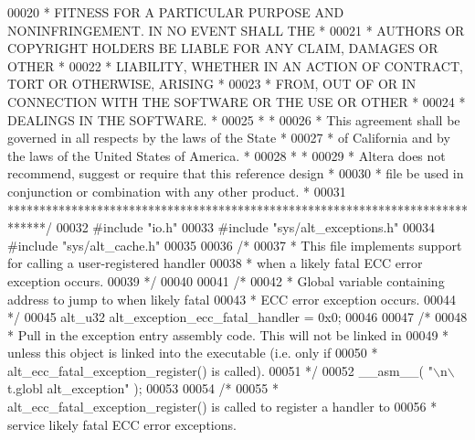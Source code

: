 \begin{DoxyCode}
00020 \textcolor{comment}{* FITNESS FOR A PARTICULAR PURPOSE AND NONINFRINGEMENT. IN NO EVENT SHALL THE *}
00021 \textcolor{comment}{* AUTHORS OR COPYRIGHT HOLDERS BE LIABLE FOR ANY CLAIM, DAMAGES OR OTHER      *}
00022 \textcolor{comment}{* LIABILITY, WHETHER IN AN ACTION OF CONTRACT, TORT OR OTHERWISE, ARISING     *}
00023 \textcolor{comment}{* FROM, OUT OF OR IN CONNECTION WITH THE SOFTWARE OR THE USE OR OTHER         *}
00024 \textcolor{comment}{* DEALINGS IN THE SOFTWARE.                                                   *}
00025 \textcolor{comment}{*                                                                             *}
00026 \textcolor{comment}{* This agreement shall be governed in all respects by the laws of the State   *}
00027 \textcolor{comment}{* of California and by the laws of the United States of America.              *}
00028 \textcolor{comment}{*                                                                             *}
00029 \textcolor{comment}{* Altera does not recommend, suggest or require that this reference design    *}
00030 \textcolor{comment}{* file be used in conjunction or combination with any other product.          *}
00031 \textcolor{comment}{******************************************************************************/}
00032 \textcolor{preprocessor}{#include "io.h"}
00033 \textcolor{preprocessor}{#include "sys/alt_exceptions.h"}
00034 \textcolor{preprocessor}{#include "sys/alt_cache.h"}
00035 
00036 \textcolor{comment}{/*}
00037 \textcolor{comment}{ * This file implements support for calling a user-registered handler}
00038 \textcolor{comment}{ * when a likely fatal ECC error exception occurs.}
00039 \textcolor{comment}{ */}
00040 
00041 \textcolor{comment}{/* }
00042 \textcolor{comment}{ * Global variable containing address to jump to when likely fatal}
00043 \textcolor{comment}{ * ECC error exception occurs.}
00044 \textcolor{comment}{ */}
00045 alt_u32 alt_exception_ecc_fatal_handler = 0x0;
00046 
00047 \textcolor{comment}{/*}
00048 \textcolor{comment}{ * Pull in the exception entry assembly code. This will not be linked in }
00049 \textcolor{comment}{ * unless this object is linked into the executable (i.e. only if }
00050 \textcolor{comment}{ * alt\_ecc\_fatal\_exception\_register() is called).}
00051 \textcolor{comment}{ */}
00052 __asm__( \textcolor{stringliteral}{"\(\backslash\)n\(\backslash\)t.globl alt\_exception"} );
00053 
00054 \textcolor{comment}{/*}
00055 \textcolor{comment}{ * alt\_ecc\_fatal\_exception\_register() is called to register a handler to}
00056 \textcolor{comment}{ * service likely fatal ECC error exceptions. }

\end{DoxyCode}

